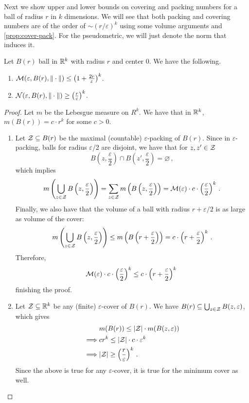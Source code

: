 \documentclass[twoside]{article}
\begin{document}
Next we show upper and lower bounds on covering and packing numbers for a ball of radius $r$ in $k$ dimensions. We will see that both packing and covering numbers are of the order of $\sim (r/\varepsilon)^k$ using some volume arguments and \cref{prop:cover-pack}. For the pseudometric, we will just denote the norm that induces it.

\begin{proposition}
    Let $B(r)$ ball in $\mathbb{R}^k$ with radius $r$ and center $0$. We have the following.
    \begin{enumerate}
        \item $\mathcal{M}(\varepsilon, B(r), \|\cdot\|) \le \left(1+\frac{2r}{\varepsilon}\right)^k$.
        \item $\mathcal{N}(\varepsilon, B(r), \|\cdot\|) \ge \left( \frac{r}{\varepsilon}\right)^k$. 
    \end{enumerate}
\end{proposition}
\begin{proof}
Let $m$ be the Lebesgue measure on $R^k$. We have that in $\mathbb{R}^k$, $m(B(r)) = c\cdot r^k$ for some $c > 0$. 
    \begin{enumerate}
        \item Let $\mathcal{Z} \subseteq B(r)$ be the maximal (countable) $\varepsilon$-packing of $B(r)$. Since in $\varepsilon$-packing, balls for radius $\varepsilon$/2 are disjoint, we have that for $z, z' \in \mathcal{Z}$
        \[
            B\left(z, \frac{\varepsilon}{2}\right) \cap B\left(z', \frac{\varepsilon}{2}\right) = \varnothing \,,
        \]
        which implies
        \[
            m\left( \bigcup_{z \in \mathcal{Z}} B\left( z, \frac\varepsilon2 \right) \right) 
            = \sum_{z \in \mathcal{Z}} m\left( B\left( z, \frac\varepsilon2 \right) \right)
            = \mathcal{M}(\varepsilon) \cdot c \cdot \left( \frac\varepsilon2 \right)^k \,.
        \]
        Finally, we also have that the volume of a ball with radius $r+\varepsilon/2$ is as large as volume of the cover:
        \[
            m\left( \bigcup_{z \in \mathcal{Z}} B\left( z, \frac\varepsilon2 \right) \right)
            \le m\left( B\left( r + \frac\varepsilon2 \right) \right)
            = c \cdot \left(r + \frac\varepsilon2 \right)^k \,.
        \]
        Therefore, 
        \[
        \mathcal{M}(\varepsilon) \cdot c \cdot \left( \frac\varepsilon2 \right)^k
        \le c \cdot \left(r + \frac\varepsilon2 \right)^k\,
        \]
        finishing the proof.
        \item Let $\mathcal{Z} \subseteq \mathbb{R}^k$ be any (finite) $\varepsilon$-cover of $B(r)$. We have $B(r) \subseteq \bigcup_{z \in \mathcal{Z}} B(z, \varepsilon)$, which gives 
        \begin{align*}
            & m(B(r)) \le |\mathcal{Z}| \cdot m(B(z,\varepsilon)) \\
            \implies &  c r^k \le |\mathcal{Z}| \cdot c \cdot \varepsilon^k \\
            \implies & |\mathcal{Z}| \ge \left( \frac{r}{\varepsilon} \right)^k \,.
        \end{align*}
        Since the above is true for any $\varepsilon$-cover, it is true for the minimum cover as well. 
    \end{enumerate}
\end{proof}
\end{document}
